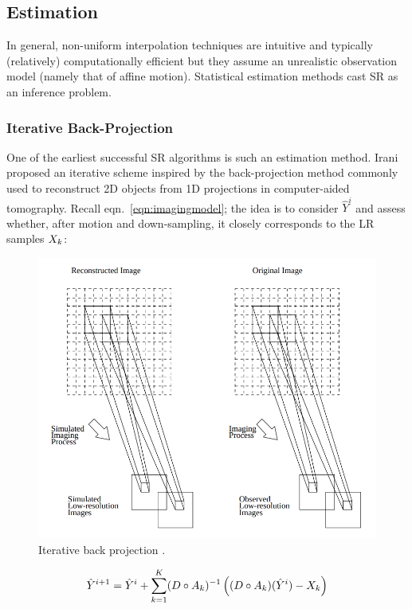 \subsection{Estimation}\label{subsec:estimation}

In general, non-uniform interpolation techniques are intuitive and typically (relatively) computationally efficient but they assume an unrealistic observation model (namely that of affine motion).
%
Statistical estimation methods cast SR as an inference problem.
%
\subsubsection{Iterative Back-Projection}\label{subsubsec:iterback}
One of the earliest successful SR algorithms is such an estimation method.
%
Irani \etal \cite{Irani1991ImprovingRB} proposed an iterative scheme inspired by the back-projection method commonly used to reconstruct 2D objects from 1D projections in computer-aided tomography.
%
Recall eqn.~\eqref{eqn:imagingmodel}; the idea is to consider \(\hat{Y}^{i}\) and assess whether, after motion and down-sampling, it closely corresponds to the LR samples \(X_k\):
\begin{figure}[!htbp]
    \centering
    \includegraphics[width=\linewidth,keepaspectratio]{figures/classical/iterative_back_projection.png}
    \caption{Iterative back projection \cite{Irani1991ImprovingRB}.}
    \label{fig:iterbackproj}
\end{figure}
\begin{equation}
    \hat{Y}^{i+1} = \hat{Y}^i + \sum_{k=1}^K (D \circ A_k)^{-1}\left( (D \circ A_k)(\hat{Y}^i) - X_k \right)
    \label{eqn:ibp}
\end{equation}
